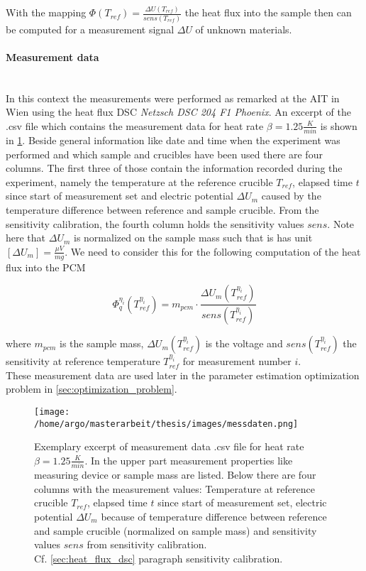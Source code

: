 \documentclass{scrartcl}[12pt, halfparskip]
\numberwithin{equation}{section}
\numberwithin{figure}{section}
\numberwithin{table}{section}
\begin{document}
With the mapping $\varPhi(T_{ref}) = \frac{\Delta U(T_{ref})}{sens(T_{ref})}$ the heat flux into the sample then can be computed for a measurement signal $\Delta U$ of unknown materials. 

\paragraph{Measurement data}\mbox{}\\
In this context the measurements were performed as remarked at the AIT in Wien using the heat flux DSC \textit{Netzsch DSC 204 F1 Phoenix\textsuperscript{\textregistered}}. An excerpt of the .csv file which contains the measurement data for heat rate ${\beta=1.25 \frac{K}{min}}$ is shown in \cref{fig:measurement_csv_data}. Beside general information like date and time when the experiment was performed and which sample and crucibles have been used there are four columns. The first three of those contain the information recorded during the experiment, namely the temperature at the reference crucible $T_{ref}$, elapsed time $t$ since start of measurement set and electric potential $\Delta U_m$ caused by the temperature difference between reference and sample crucible. 
From the sensitivity calibration, the fourth column holds the sensitivity values $sens$.
Note here that $\Delta U_m$ is normalized on the sample mass such that is has unit $[\Delta U_m]=\frac{\mu V}{mg}$. We need to consider this for the following computation of the heat flux into the PCM

\begin{equation}
	\varPhi_q^{\eta_i}(T_{ref}^{\eta_i}) = m_{pcm} \cdot \frac{\Delta U_m(T_{ref}^{\eta_i})}{sens(T_{ref}^{\eta_i})}
\end{equation}

where $m_{pcm}$ is the sample mass, $\Delta U_m(T_{ref}^{\eta_i})$ is the voltage and $sens(T_{ref}^{\eta_i})$ the sensitivity at reference temperature $T_{ref}^{\eta_i}$ for measurement number $i$. \\
These measurement data are used later in the parameter estimation optimization problem in \cref{sec:optimization_problem}.


\begin{figure}[H]
	\centering
	\texttt{[image: /home/argo/masterarbeit/thesis/images/messdaten.png]}
	\caption{Exemplary excerpt of measurement data .csv file for heat rate $\beta=1.25 \frac{K}{min}$. In the upper part measurement properties like measuring device or sample mass are listed. Below there are four columns with the measurement values: Temperature at reference crucible $T_{ref}$, elapsed time $t$ since start of measurement set, electric potential $\Delta U_m$ because of temperature difference between reference and sample crucible (normalized on sample mass) and sensitivity values $sens$ from sensitivity calibration. \\
	Cf. \cref{sec:heat_flux_dsc} paragraph sensitivity calibration.}
	\label{fig:measurement_csv_data}
\end{figure}
\end{document}
